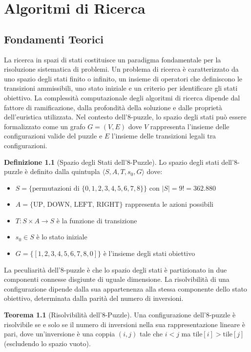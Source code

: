 \documentclass[12pt,a4paper]{report}
\theoremstyle{definition}
\newtheorem{definizione}{Definizione}[chapter]
\newtheorem{teorema}{Teorema}[chapter]
\begin{document}
\chapter{Algoritmi di Ricerca}

\section{Fondamenti Teorici}

La ricerca in spazi di stati costituisce un paradigma fondamentale per la risoluzione sistematica di problemi. Un problema di ricerca è caratterizzato da uno spazio degli stati finito o infinito, un insieme di operatori che definiscono le transizioni ammissibili, uno stato iniziale e un criterio per identificare gli stati obiettivo. La complessità computazionale degli algoritmi di ricerca dipende dal fattore di ramificazione, dalla profondità della soluzione e dalle proprietà dell'euristica utilizzata. Nel contesto dell'8-puzzle, lo spazio degli stati può essere formalizzato come un grafo $G = (V, E)$ dove $V$ rappresenta l'insieme delle configurazioni valide del puzzle e $E$ l'insieme delle transizioni legali tra configurazioni.

\begin{definizione}[Spazio degli Stati dell'8-Puzzle]
Lo spazio degli stati dell'8-puzzle è definito dalla quintupla $\langle S, A, T, s_0, G \rangle$ dove:
\begin{itemize}
    \item $S = \{\text{permutazioni di } \{0,1,2,3,4,5,6,7,8\}\}$ con $|S| = 9! = 362.880$
    \item $A = \{\text{UP, DOWN, LEFT, RIGHT}\}$ rappresenta le azioni possibili
    \item $T: S \times A \rightarrow S$ è la funzione di transizione
    \item $s_0 \in S$ è lo stato iniziale
    \item $G = \{[1,2,3,4,5,6,7,8,0]\}$ è l'insieme degli stati obiettivo
\end{itemize}
\end{definizione}

La peculiarità dell'8-puzzle è che lo spazio degli stati è partizionato in due componenti connesse disgiunte di uguale dimensione. La risolvibilità di una configurazione dipende dalla sua appartenenza alla stessa componente dello stato obiettivo, determinata dalla parità del numero di inversioni.

\begin{teorema}[Risolvibilità dell'8-Puzzle]
Una configurazione dell'8-puzzle è risolvibile se e solo se il numero di inversioni nella sua rappresentazione lineare è pari, dove un'inversione è una coppia $(i,j)$ tale che $i < j$ ma $\text{tile}[i] > \text{tile}[j]$ (escludendo lo spazio vuoto).
\end{teorema}
\end{document}
